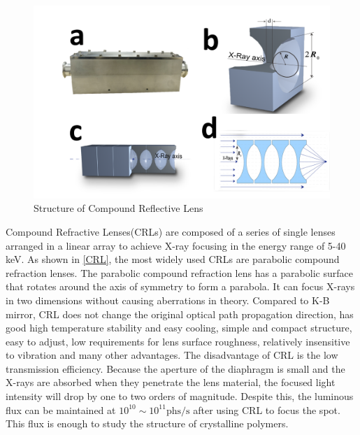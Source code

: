 \documentclass{Head}
\begin{document}
\begin{figure}
  \centering
  \includegraphics[scale=0.5]{Figures/Fig2CRL.png}
  \caption{Structure of Compound Reflective Lens}
  \label{CRL}
\end{figure}
Compound Refractive Lenses(CRLs) are composed of a series of single lenses arranged in a linear array to achieve X-ray focusing in the energy range of 5-40 keV.
As shown in \autoref{CRL}, the most widely used CRLs are parabolic compound refraction lenses.
The parabolic compound refraction lens has a parabolic surface that rotates around the axis of symmetry to form a parabola.
It can focus X-rays in two dimensions without causing aberrations in theory.
Compared to K-B mirror, CRL does not change the original optical path propagation direction, has good high temperature stability and easy cooling, simple and compact structure, easy to adjust, low requirements for lens surface roughness, relatively insensitive to vibration and many other advantages.
The disadvantage of CRL is the low transmission efficiency.
Because the aperture of the diaphragm is small and the X-rays are absorbed when they penetrate the lens material, the focused light intensity will drop by one to two orders of magnitude.
Despite this, the luminous flux can be maintained at $\mathrm{10^{10}\sim 10^{11} phs/s}$ after using CRL to focus the spot.
This flux is enough to study the structure of crystalline polymers.
\end{document}
